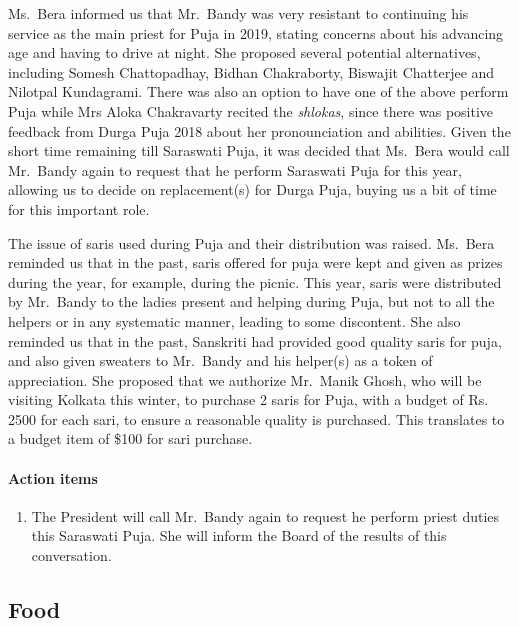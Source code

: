\documentclass[12pt,]{article}
\providecommand{\tightlist}{%
  \setlength{\itemsep}{0pt}\setlength{\parskip}{0pt}}
\let\oldparagraph\paragraph
\renewcommand{\paragraph}[1]{\oldparagraph{#1}\mbox{}}
\begin{document}
Ms.~Bera informed us that Mr.~Bandy was very resistant to continuing his
service as the main priest for Puja in 2019, stating concerns about his
advancing age and having to drive at night. She proposed several
potential alternatives, including Somesh Chattopadhay, Bidhan
Chakraborty, Biswajit Chatterjee and Nilotpal Kundagrami. There was also
an option to have one of the above perform Puja while Mrs Aloka
Chakravarty recited the \emph{shlokas}, since there was positive
feedback from Durga Puja 2018 about her pronounciation and abilities.
Given the short time remaining till Saraswati Puja, it was decided that
Ms.~Bera would call Mr.~Bandy again to request that he perform Saraswati
Puja for this year, allowing us to decide on replacement(s) for Durga
Puja, buying us a bit of time for this important role.

The issue of saris used during Puja and their distribution was raised.
Ms.~Bera reminded us that in the past, saris offered for puja were kept
and given as prizes during the year, for example, during the picnic.
This year, saris were distributed by Mr.~Bandy to the ladies present and
helping during Puja, but not to all the helpers or in any systematic
manner, leading to some discontent. She also reminded us that in the
past, Sanskriti had provided good quality saris for puja, and also given
sweaters to Mr.~Bandy and his helper(s) as a token of appreciation. She
proposed that we authorize Mr.~Manik Ghosh, who will be visiting Kolkata
this winter, to purchase 2 saris for Puja, with a budget of Rs. 2500 for
each sari, to ensure a reasonable quality is purchased. This translates
to a budget item of \$100 for sari purchase.

\hypertarget{action-items-1}{%
\paragraph{Action items}\label{action-items-1}}

\begin{enumerate}
\def\labelenumi{\arabic{enumi}.}
\tightlist
\item
  The President will call Mr.~Bandy again to request he perform priest
  duties this Saraswati Puja. She will inform the Board of the results
  of this conversation.
\end{enumerate}

\hypertarget{food}{%
\subsection{Food}\label{food}}
\end{document}
